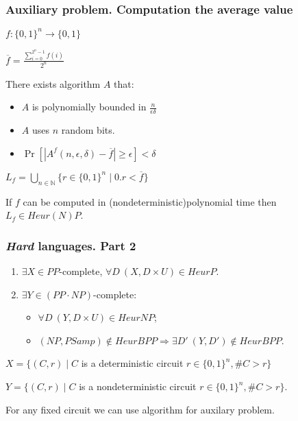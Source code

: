 \begin{frame}
    \frametitle{Auxiliary problem. Computation the average value}

    $f:\{0, 1\}^{n} \rightarrow \{0, 1\}$
    
    $\overline{f} = \frac{\sum\limits_{i = 0}^{2^n - 1}f(i)}{2^n}$

    \pause
    
    \begin{statement}[Goldreich]
        There exists algorithm $A$ that:
        \begin{itemize}
	        \item $A$ is polynomially bounded in $\frac{n}{\epsilon\delta}$
        	\item {\color{blue}$A$ uses $n$ random bits}.
        	\item $\Pr[|A^{f}(n, \epsilon, \delta) - \overline{f}| \ge \epsilon] <
		        \delta$
        \end{itemize}
    \end{statement}

    \pause
    $L_f = \bigcup\limits_{n \in \mathbb{N}}\{r \in \{0, 1\}^n \mid 0.r < \overline{f}\}$

    \begin{lemma}
        If $f$ can be computed in (nondeterministic)polynomial time then $L_f \in Heur(N)P$.
    \end{lemma}

\end{frame}


\begin{frame}
    \frametitle{\textit{Hard} languages. Part 2}
    \begin{theorem}
        \begin{enumerate}
            \item $\exists X \in PP$-complete, $\forall D~
	    		(X, D \times U) \in HeurP$.
    		\pause
    		\item $\exists Y \in (PP \cdot NP)$-complete:
		        \begin{itemize}
        	        \item $\forall D~ (Y, D \times U) \in HeurNP$;
                	\item $(NP, PSamp) \notin HeurBPP \Rightarrow \exists D'~ (Y, D')
                		\notin HeurBPP$.
		        \end{itemize}
        		
        \end{enumerate}
    \end{theorem}

    \pause
    $X = \{(C, r) \mid C$ is a deterministic circuit $r \in \{0, 1\}^n, \#C > r\}$
    
    $Y = \{(C, r) \mid C$ is a nondeterministic circuit $r \in \{0, 1\}^n, \#C >
    r\}$.

    \pause

    \vspace{0.2cm}
    For any fixed circuit we can use algorithm for auxilary problem.
\end{frame}



